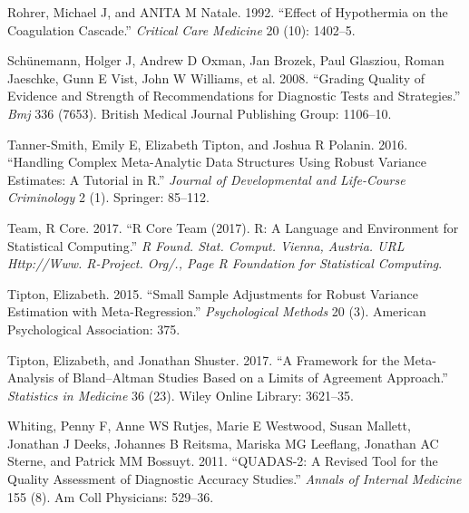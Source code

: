 \documentclass[smallextended]{svjour3}       %
\begin{document}
\leavevmode\hypertarget{ref-rohrer1992effect}{}%
Rohrer, Michael J, and ANITA M Natale. 1992. ``Effect of Hypothermia on
the Coagulation Cascade.'' \emph{Critical Care Medicine} 20 (10):
1402--5.

\leavevmode\hypertarget{ref-schunemann2008grading}{}%
Schünemann, Holger J, Andrew D Oxman, Jan Brozek, Paul Glasziou, Roman
Jaeschke, Gunn E Vist, John W Williams, et al. 2008. ``Grading Quality
of Evidence and Strength of Recommendations for Diagnostic Tests and
Strategies.'' \emph{Bmj} 336 (7653). British Medical Journal Publishing
Group: 1106--10.

\leavevmode\hypertarget{ref-tanner2016handling}{}%
Tanner-Smith, Emily E, Elizabeth Tipton, and Joshua R Polanin. 2016.
``Handling Complex Meta-Analytic Data Structures Using Robust Variance
Estimates: A Tutorial in R.'' \emph{Journal of Developmental and
Life-Course Criminology} 2 (1). Springer: 85--112.

\leavevmode\hypertarget{ref-team2017r}{}%
Team, R Core. 2017. ``R Core Team (2017). R: A Language and Environment
for Statistical Computing.'' \emph{R Found. Stat. Comput. Vienna,
Austria. URL Http://Www. R-Project. Org/., Page R Foundation for
Statistical Computing}.

\leavevmode\hypertarget{ref-tipton2015small}{}%
Tipton, Elizabeth. 2015. ``Small Sample Adjustments for Robust Variance
Estimation with Meta-Regression.'' \emph{Psychological Methods} 20 (3).
American Psychological Association: 375.

\leavevmode\hypertarget{ref-tipton2017framework}{}%
Tipton, Elizabeth, and Jonathan Shuster. 2017. ``A Framework for the
Meta-Analysis of Bland--Altman Studies Based on a Limits of Agreement
Approach.'' \emph{Statistics in Medicine} 36 (23). Wiley Online Library:
3621--35.

\leavevmode\hypertarget{ref-whiting2011quadas}{}%
Whiting, Penny F, Anne WS Rutjes, Marie E Westwood, Susan Mallett,
Jonathan J Deeks, Johannes B Reitsma, Mariska MG Leeflang, Jonathan AC
Sterne, and Patrick MM Bossuyt. 2011. ``QUADAS-2: A Revised Tool for the
Quality Assessment of Diagnostic Accuracy Studies.'' \emph{Annals of
Internal Medicine} 155 (8). Am Coll Physicians: 529--36.



\end{document}
